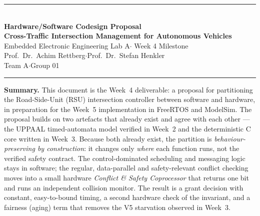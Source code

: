 \documentclass[11pt]{article}
\newcommand{\code}[1]{\texttt{\detokenize{#1}}}
\begin{document}
\begin{center}
{\color{softrule}\rule{\textwidth}{0.4pt}}\\[1.0ex]
{\LARGE\bfseries\color{ink} Hardware/Software Codesign Proposal}\\[0.7ex]
{\large\bfseries\color{accent} Cross-Traffic Intersection Management for Autonomous Vehicles}\\[1.1ex]
{\normalsize Embedded Electronic Engineering Lab A\;\textbf{$\cdot$}\; Week 4 Milestone}\\[0.6ex]
{\small Prof.\ Dr.\ Achim Rettberg\quad$\cdot$\quad Prof.\ Dr.\ Stefan Henkler}\\[0.3ex]
{\small Team A\;$\cdot$\;Group 01}\\[1.0ex]
{\color{softrule}\rule{\textwidth}{0.4pt}}
\end{center}
\vspace{0.4ex}

\begin{center}
\colorbox{accent!7}{%
\begin{minipage}{0.96\textwidth}
\small
\textbf{\color{accent}Summary.}\; This document is the Week~4 deliverable: a proposal for partitioning the
Road-Side-Unit (RSU) intersection controller between software and hardware, in preparation for the
Week~5 implementation in FreeRTOS and ModelSim. The proposal builds on two artefacts that already
exist and agree with each other --- the UPPAAL timed-automata model verified in Week~2 and the
deterministic C core written in Week~3. Because both already exist, the partition is
\emph{behaviour-preserving by construction}: it changes only \emph{where} each function runs, not the
verified safety contract. The control-dominated scheduling and messaging logic stays in software; the
regular, data-parallel and safety-relevant conflict checking moves into a small hardware
\emph{Conflict \& Safety Coprocessor} that returns one \code{safe_to_grant} bit and runs an independent
collision monitor. The result is a grant decision with constant, easy-to-bound timing, a second
hardware check of the \code{A[] noCollision()} invariant, and a fairness (aging) term that removes the
V5 starvation observed in Week~3.
\end{minipage}}
\end{center}
\vspace{0.6ex}

\end{document}

